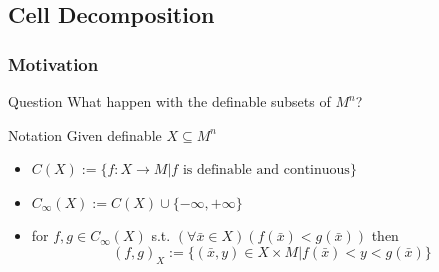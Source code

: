 \subsection{Cell Decomposition}

\begin{frame}[c]\frametitle{Motivation}
	
	\begin{beamerboxesrounded}[shadow=true, upper=question]{Question}
		What happen with the definable subsets of $M^n$?
	\end{beamerboxesrounded}
    
	\begin{beamerboxesrounded}[shadow=true]{Notation}
		Given definable $X \subseteq M^n$
		\begin{itemize}
			\item $C(X):= \{ f:X \to M|f \text{ is definable and continuous}\}$
			\item $C_\infty(X):=C(X) \cup \{ -\infty, +\infty \}$
			\item for $f,g \in C_\infty(X)$ s.t. $(\forall \bar{x} \in X)(f(\bar{x})<g(\bar{x}))$ then 
			$$(f,g)_X := \{  (\bar{x},y)\in X \times M|f(\bar{x})<y<g(\bar{x})\}$$
		\end{itemize}
	\end{beamerboxesrounded}

\end{frame}

